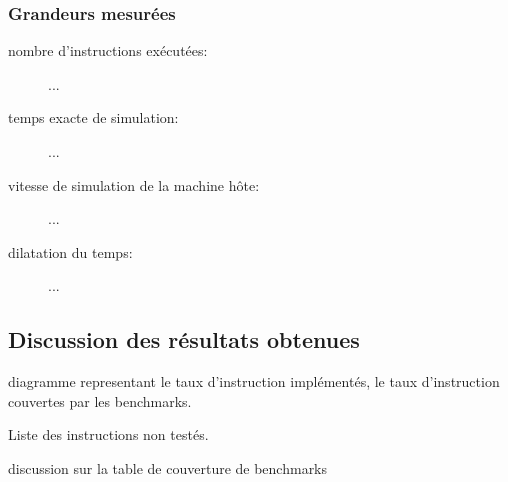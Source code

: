 \subsubsection{Grandeurs mesurées}

\begin{description}
\item [nombre d'instructions exécutées:]...
\item [temps exacte de simulation:]...
\item [vitesse de simulation de la machine hôte:]...
\item [dilatation du temps:]...
\end{description}

\subsection{Discussion des résultats obtenues}

diagramme representant le taux d'instruction implémentés, le taux d'instruction couvertes par les benchmarks.

Liste des instructions non testés.

discussion sur la table de couverture de benchmarks